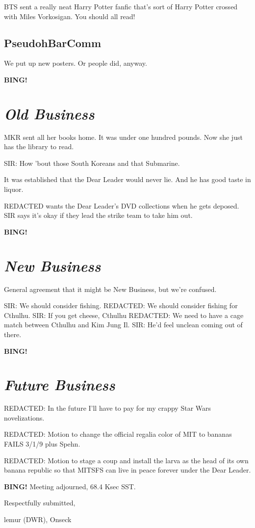 \documentclass[10pt]{article}
\newcommand{\bing}{{\bf BING!} }
\newcommand{\goto}[1]{\bing \vskip 12pt \section*{{\em{#1}}}}
\newcommand{\ps}{ plus Spehn\xspace}
\newcommand{\onseck}{lemur (DWR), Onseck}
\begin{document}
BTS sent a really neat Harry Potter fanfic that's sort of Harry Potter
crossed with Miles Vorkosigan.  You should all read!

\subsection*{PseudohBarComm}

We put up new posters.  Or people did, anyway.


\goto{Old Business}

MKR sent all her books home.  It was under one hundred pounds.  Now she
just has the library to read.

SIR: How 'bout those South Koreans and that Submarine.

It was established that the Dear Leader would never lie.  And he has good
taste in liquor.

REDACTED wants the Dear Leader's DVD collections when he gets deposed.  SIR
says it's okay if they lead the strike team to take him out.


\goto{New Business}

General agreement that it might be New Business, but we're confused.

SIR: We should consider fishing.
REDACTED: We should consider fishing for Cthulhu.
SIR: If you get cheese, Cthulhu
REDACTED: We need to have a cage match between Cthulhu and Kim Jung Il.
SIR: He'd feel unclean coming out of there.

\goto{Future Business}

REDACTED: In the future I'll have to pay for my crappy Star Wars
novelizations.

REDACTED: Motion to change the official regalia color of MIT to bananas FAILS
3/1/9\ps.

REDACTED: Motion to stage a coup and install the larva as the head of its own
banana republic so that MITSFS can live in peace forever under the Dear Leader.

\bing
\noindent
Meeting adjourned, 68.4 Ksec SST.

\vspace{18pt}

\centerline{Respectfully submitted,}
\centerline{\onseck}
\end{document}

